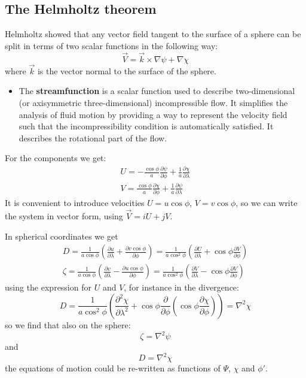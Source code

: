 \subsection{The Helmholtz theorem}
Helmholtz showed that any vector field tangent to the surface of a sphere can be
split in terms of two scalar functions in the following way:
\begin{equation}\label{eq.helmholtz}
	\vec{V}=\vec{k}\times\nabla\psi+\nabla\chi
\end{equation}
where $\vec{k}$ is the vector normal to the surface of the sphere.
\begin{itemize}
	\item The \textbf{streamfunction} is a scalar function used to describe two-dimensional (or axisymmetric three-dimensional) incompressible flow. It simplifies the analysis of fluid motion by providing a way to represent the velocity field such that the incompressibility condition is automatically satisfied. It describes the rotational part of the flow.
\end{itemize}

For the components we get:
\begin{align}\label{eq.components helmholtz}
	U=-\frac{\cos\phi}{a}\frac{\partial\psi}{\partial\phi}+\frac{1}{a}\frac{\partial\chi}{\partial\lambda} \\
	V=\frac{\cos\phi}{a}\frac{\partial\chi}{\partial\phi}+\frac{1}{a}\frac{\partial\psi}{\partial\lambda}
\end{align}
It is convenient to introduce velocities $U=u\cos\phi$, $V=v\cos\phi$, so we can write the system in vector form, using $\vec{V}=iU+jV$.

In spherical coordinates we get
\begin{align*}
	D=\frac{1}{a\cos\phi}\left(\frac{\partial u}{\partial\lambda}+\frac{\partial v\cos\phi}{\partial\phi}\right)=\frac{1}{a\cos^2\phi}\left(\frac{\partial U}{\partial\lambda}+\cos\phi\frac{\partial V}{\partial\phi}\right) \\
	\zeta= \frac{1}{a\cos\phi}\left(\frac{\partial v}{\partial\lambda}-\frac{\partial u\cos\phi}{\partial\phi}\right)=\frac{1}{a\cos^2\phi}\left(\frac{\partial V}{\partial\lambda}-\cos\phi\frac{\partial V}{\partial\phi}\right)
\end{align*}
using the expression for $U$ and $V$, for instance in the divergence:
\begin{equation}\label{eq.finitedivergence}
	D=\frac{1}{a\cos^2\phi}\left(\frac{\partial^2\chi}{\partial\lambda^2}+\cos\phi\frac{\partial}{\partial\phi}\left(\cos\phi\frac{\partial\chi}{\partial\phi}\right)\right)=\nabla^2\chi
\end{equation}
so we find that also on the sphere:
\begin{equation}\label{eq. vorticity}
	\zeta=\nabla^2\psi
\end{equation}
and
\begin{equation}\label{eq.divergence}
	D=\nabla^2\chi
\end{equation}
the equations of motion could be re-written as functions of $\Psi$, $\chi$ and $\phi'$.

